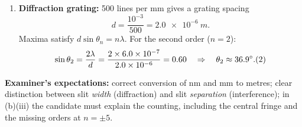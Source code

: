 \documentclass[11pt]{article}
\begin{document}
\begin{corrige}
\begin{enumerate}
\begin{enumerate}
\end{enumerate}
\item \textbf{Diffraction grating:} 500 lines per mm gives a grating spacing
\[ d = \frac{10^{-3}}{500} = \SI{2.0e-6}{m}. \]
Maxima satisfy $d\sin\theta_n = n\lambda$. For the second order ($n = 2$):
\[ \sin\theta_2 = \frac{2\lambda}{d} = \frac{2\times 6.0\times10^{-7}}{2.0\times10^{-6}} = 0.60
\quad\Rightarrow\quad \theta_2 \approx 36.9^\circ. \hfill (2) \]
\end{enumerate}
\textbf{Examiner's expectations:} correct conversion of nm and mm to metres; clear distinction between slit \emph{width} (diffraction) and slit \emph{separation} (interference); in (b)(iii) the candidate must explain the counting, including the central fringe and the missing orders at $n = \pm 5$.
\end{corrige}
\end{document}
